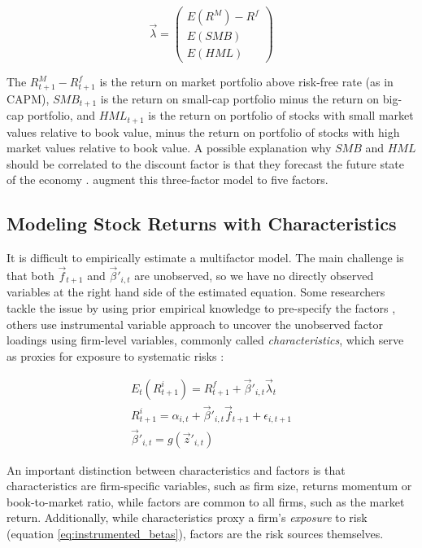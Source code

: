 			\begin{equation}
			  \vec{\lambda} =
				\begin{pmatrix}
					E(R^M)-R^f \\
					E(SMB) \\
					E(HML)				
				\end{pmatrix} 
			\end{equation}
			 
			The $R^M_{t+1}-R^f_{t+1}$ is the return on market portfolio above risk-free rate (as in CAPM), $SMB_{t+1}$ is the return on small-cap portfolio minus the return on big-cap portfolio, and $HML_{t+1}$ is the return on portfolio of stocks with small market values relative to book value, minus the return on portfolio of stocks with high market values relative to book value. A possible explanation why $SMB$ and $HML$ should be correlated to the discount factor is that they forecast the future state of the economy \citep{liew2000can}.		
			\cite{fama2015five} augment this three-factor model to five factors. 
			
			
		\subsection{Modeling Stock Returns with Characteristics}
			
			It is difficult to empirically estimate a multifactor model. The main challenge is that both $\vec{f}_{t+1}$ and $\vec{\beta}'_{i,t}$ are unobserved, so we have no directly observed variables at the right hand side of the estimated equation. Some researchers tackle the issue by using prior empirical knowledge to pre-specify the factors  \citep{fama1993common, fama2015five}, others use instrumental variable approach \citep{kelly2019characteristics} to uncover the unobserved factor loadings using firm-level variables, commonly called \textit{characteristics}, which serve as proxies for exposure to systematic risks \cite{kelly2019characteristics}:  
			
			\begin{align}
				E_t(R^i_{t+1}) = R^f_{t+1} + \vec{\beta}'_{i,t} \vec{\lambda}_{t}  \label{eq:ER_betalambda} \\
				R^i_{t+1} = \alpha_{i,t} + \vec{\beta}'_{i,t} \vec{f}_{t+1} + \epsilon_{i,t+1} \\
				\vec{\beta}'_{i,t} = g(\vec{z}'_{i,t}) \label{eq:instrumented_betas}
			\end{align}
			 
						
			An important distinction between characteristics and factors is that characteristics are firm-specific variables, such as firm size, returns momentum or book-to-market ratio, while factors are common to all firms, such as the market return. Additionally, while characteristics proxy a firm's \textit{exposure} to risk (equation \ref{eq:instrumented_betas}), factors are the risk sources themselves. 
			
